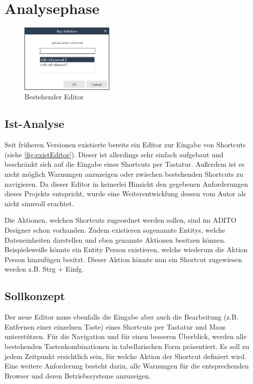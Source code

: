 \section{Analysephase}

\begin{figure}
	\vspace{-12px}
	\centering
	\includegraphics[width=170px]{../graphic/images/screenshots/Alter-Editor}
	\caption{Bestehender Editor}
	\label{fig:existEditor}
\end{figure}

\subsection{Ist-Analyse}

Seit früheren Versionen existierte bereits ein Editor zur Eingabe von Shortcuts (siehe \autoref{fig:existEditor}). Dieser ist allerdings sehr einfach aufgebaut und beschränkt sich auf die Eingabe eines Shortcuts per Tastatur. Außerdem ist es nicht möglich Warnungen anzuzeigen oder zwischen bestehenden Shortcuts zu navigieren. Da dieser Editor in keinerlei Hinsicht den gegebenen Anforderungen dieses Projekts entspricht, wurde eine Weiterentwicklung dessen vom Autor als nicht sinnvoll erachtet.

Die Aktionen, welchen Shortcuts zugeordnet werden sollen, sind im ADITO Designer schon vorhanden. Zudem existieren sogenannte Entitys, welche Dateneinheiten darstellen und eben genannte Aktionen besitzen können. Beispielsweiße könnte ein Entity \glqq Person\grqq\xspace existieren, welche wiederum die Aktion \glqq Person hinzufügen\grqq\xspace besitzt. Dieser Aktion könnte nun ein Shortcut zugewiesen werden z.B. Strg + Einfg.

\subsection{Sollkonzept}

Der neue Editor muss ebenfalls die Eingabe aber auch die Bearbeitung (z.B. Entfernen einer einzelnen Taste) eines Shortcuts per Tastatur und Maus unterstützen. Für die Navigation und für einen besseren Überblick, werden alle bestehenden Tastenkombinationen in tabellarischen Form präsentiert. Es soll zu jedem Zeitpunkt ersichtlich sein, für welche Aktion der Shortcut definiert wird. Eine weitere Anforderung besteht darin, alle Warnungen für die entsprechenden Browser und deren Betriebssysteme anzuzeigen.

